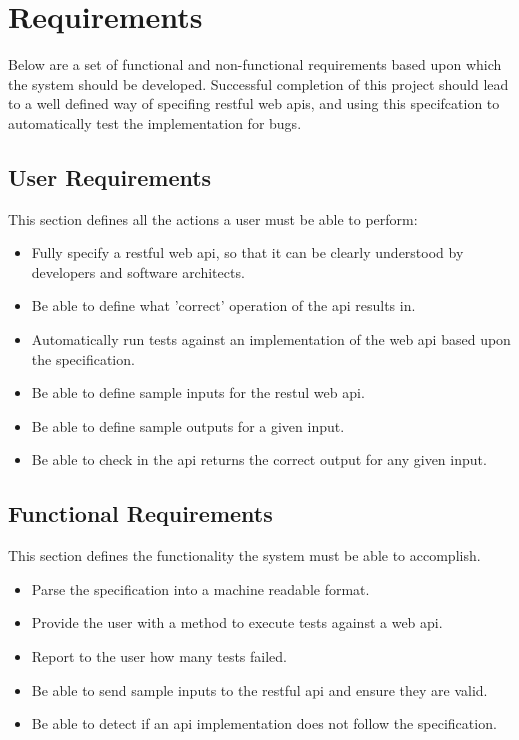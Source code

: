 \chapter{Requirements}

Below are a set of functional and non-functional requirements based upon which the system should be developed. Successful completion of this project should lead to a well defined way of specifing restful web apis, and using this specifcation to automatically test the implementation for bugs.

\section{User Requirements}

This section defines all the actions a user must be able to perform:

\begin{itemize}
\item Fully specify a restful web api, so that it can be clearly understood by developers and software architects.
\item Be able to define what 'correct' operation of the api results in.
\item Automatically run tests against an implementation of the web api based upon the specification.
\item Be able to define sample inputs for the restul web api.
\item Be able to define sample outputs for a given input.
\item Be able to check in the api returns the correct output for any given input.
\end{itemize}

\section{Functional Requirements}

This section defines the functionality the system must be able to accomplish.

\begin{itemize}
\item Parse the specification into a machine readable format.
\item Provide the user with a method to execute tests against a web api.
\item Report to the user how many tests failed.
\item Be able to send sample inputs to the restful api and ensure they are valid.
\item Be able to detect if an api implementation does not follow the specification.
\end{itemize}

